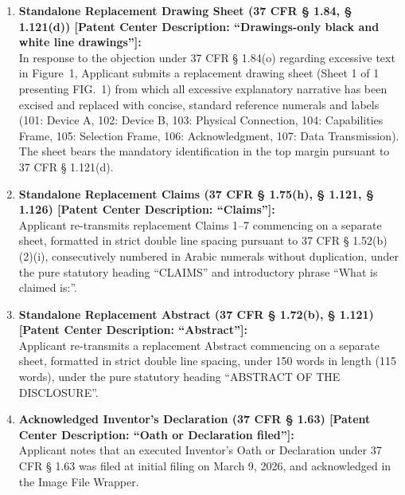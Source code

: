 \documentclass[11pt,letterpaper]{article}
\begin{document}
\begin{enumerate}[leftmargin=*]
    \item \textbf{Standalone Replacement Drawing Sheet (37 CFR \S{} 1.84, \S{} 1.121(d)) [Patent Center Description: ``Drawings-only black and white line drawings'']:} \\
    In response to the objection under 37 CFR \S{} 1.84(o) regarding excessive text in Figure~1, Applicant submits a replacement drawing sheet (Sheet 1 of 1 presenting FIG.~1) from which all excessive explanatory narrative has been excised and replaced with concise, standard reference numerals and labels (101: Device A, 102: Device B, 103: Physical Connection, 104: Capabilities Frame, 105: Selection Frame, 106: Acknowledgment, 107: Data Transmission). The sheet bears the mandatory identification in the top margin pursuant to 37 CFR \S{} 1.121(d).

    \item \textbf{Standalone Replacement Claims (37 CFR \S{} 1.75(h), \S{} 1.121, \S{} 1.126) [Patent Center Description: ``Claims'']:} \\
    Applicant re-transmits replacement Claims 1--7 commencing on a separate sheet, formatted in strict double line spacing pursuant to 37 CFR \S{} 1.52(b)(2)(i), consecutively numbered in Arabic numerals without duplication, under the pure statutory heading ``CLAIMS'' and introductory phrase ``What is claimed is:''.

    \item \textbf{Standalone Replacement Abstract (37 CFR \S{} 1.72(b), \S{} 1.121) [Patent Center Description: ``Abstract'']:} \\
    Applicant re-transmits a replacement Abstract commencing on a separate sheet, formatted in strict double line spacing, under 150 words in length (115 words), under the pure statutory heading ``ABSTRACT OF THE DISCLOSURE''.

    \item \textbf{Acknowledged Inventor's Declaration (37 CFR \S{} 1.63) [Patent Center Description: ``Oath or Declaration filed'']:} \\
    Applicant notes that an executed Inventor's Oath or Declaration under 37 CFR \S{} 1.63 was filed at initial filing on March 9, 2026, and acknowledged in the Image File Wrapper.


\end{enumerate}
\end{document}
